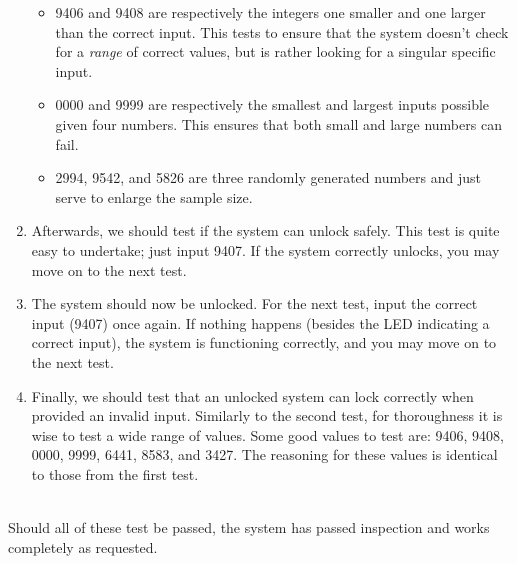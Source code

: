 \documentclass[10pt,a4paper]{article}
\begin{document}
\begin{enumerate}
	\begin{itemize}
		\item 9406 and 9408 are respectively the integers one smaller and one larger than the correct input. This tests to ensure that the system doesn't check for a \textit{range} of correct values, but is rather looking for a singular specific input. 
		\item 0000 and 9999 are respectively the smallest and largest inputs possible given four numbers. This ensures that both small and large numbers can fail.
		\item 2994, 9542, and 5826 are three randomly generated numbers and just serve to enlarge the sample size.
	\end{itemize}
	\item Afterwards, we should test if the system can unlock safely. This test is quite easy to undertake; just input 9407. If the system correctly unlocks, you may move on to the next test. 
	\item The system should now be unlocked. For the next test, input the correct input (9407) once again. If nothing happens (besides the LED indicating a correct input), the system is functioning correctly, and you may move on to the next test.
	\item Finally, we should test that an unlocked system can lock correctly when provided an invalid input. Similarly to the second test, for thoroughness it is wise to test a wide range of values. Some good values to test are: 9406, 9408, 0000, 9999, 6441, 8583, and 3427. The reasoning for these values is identical to those from the first test. 
\end{enumerate}~\\
Should all of these test be passed, the system has passed inspection and works completely as requested.
\end{document}

